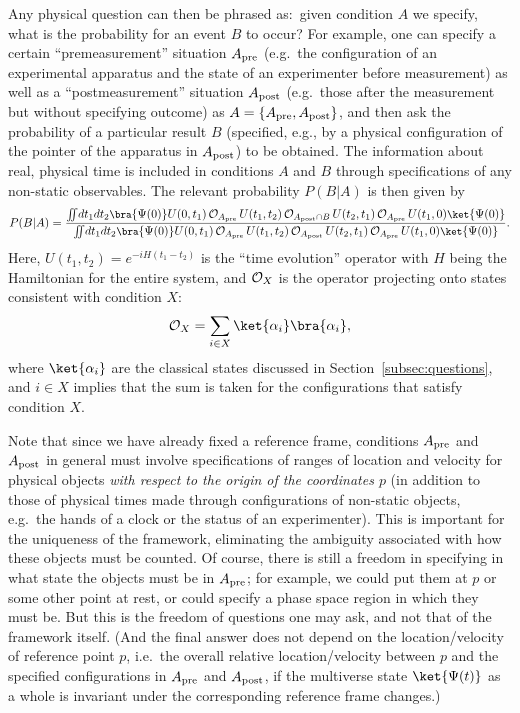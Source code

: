 \documentclass[12pt]{article}
\begin{document}
Any physical question can then be phrased as:\ given condition $A$ 
we specify, what is the probability for an event $B$ to occur? 
For example, one can specify a certain ``premeasurement'' situation 
$A_{\rm pre}$ (e.g.\ the configuration of an experimental apparatus 
and the state of an experimenter before measurement) as well as a 
``postmeasurement'' situation $A_{\rm post}$ (e.g.\ those after the 
measurement but without specifying outcome) as $A = \{ A_{\rm pre}, 
A_{\rm post} \}$, and then ask the probability of a particular result 
$B$ (specified, e.g., by a physical configuration of the pointer of 
the apparatus in $A_{\rm post}$) to be obtained.  The information 
about real, physical time is included in conditions $A$ and $B$ through 
specifications of any non-static observables.  The relevant probability 
$P(B|A)$ is then given by
%
\begin{equation}\small
  P(B|A) = \frac{\int\!\!\!\int\!dt_1 dt_2 \bra{\Psi(0)} U(0,t_1)\, 
      {\cal O}_{A_{\rm pre}}\, U(t_1,t_2)\, {\cal O}_{A_{\rm post} \cap B}\, 
      U(t_2,t_1)\, {\cal O}_{A_{\rm pre}}\, U(t_1,0) \ket{\Psi(0)}}
    {\int\!\!\!\int\!dt_1 dt_2 \bra{\Psi(0)} U(0,t_1)\, 
      {\cal O}_{A_{\rm pre}}\, U(t_1,t_2)\, {\cal O}_{A_{\rm post}}\, 
      U(t_2,t_1)\, {\cal O}_{A_{\rm pre}}\, U(t_1,0) \ket{\Psi(0)}}.
\label{eq:prob-final}
\end{equation}
%
Here, $U(t_1,t_2) = e^{-iH(t_1-t_2)}$ is the ``time evolution'' operator 
with $H$ being the Hamiltonian for the entire system, and ${\cal O}_X$ 
is the operator projecting onto states consistent with condition $X$:
%
\begin{equation}
  {\cal O}_X = \sum_{i \in X} \ket{\alpha_i} \bra{\alpha_i},
\label{eq:O_A-O_B}
\end{equation}
%
where $\ket{\alpha_i}$ are the classical states discussed in 
Section~\ref{subsec:questions}, and $i \in X$ implies that the sum 
is taken for the configurations that satisfy condition $X$.

Note that since we have already fixed a reference frame, conditions 
$A_{\rm pre}$ and $A_{\rm post}$ in general must involve specifications 
of ranges of location and velocity for physical objects {\it with respect 
to the origin of the coordinates $p$} (in addition to those of physical 
times made through configurations of non-static objects, e.g.\ the hands 
of a clock or the status of an experimenter).  This is important for 
the uniqueness of the framework, eliminating the ambiguity associated 
with how these objects must be counted.  Of course, there is still a 
freedom in specifying in what state the objects must be in $A_{\rm pre}$; 
for example, we could put them at $p$ or some other point at rest, or 
could specify a phase space region in which they must be.  But this 
is the freedom of questions one may ask, and not that of the framework 
itself.  (And the final answer does not depend on the location/velocity 
of reference point $p$, i.e.\ the overall relative location/velocity 
between $p$ and the specified configurations in $A_{\rm pre}$ and 
$A_{\rm post}$, if the multiverse state $\ket{\Psi(t)}$ as a whole 
is invariant under the corresponding reference frame changes.)
\end{document}
